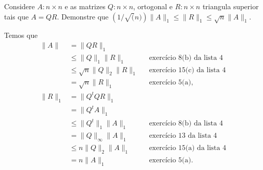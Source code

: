 \documentclass[a4paper,12pt, leqno, answers]{exam}
\newcommand{\cond}{\text{cond}}
\begin{document}
\begin{questions}

    \question Considere $A: n \times n$ e as matrizes $Q: n \times n$, ortogonal e $R: n \times n$ triangula superior tais que $A = QR$. Demonstre que $\left( 1 / \sqrt(n) \right) \| A \|_1 \leq \| R \|_1 \leq \sqrt{n} \| A \|_1$.
    \begin{solution}
        Temos que
        \begin{align*}
            \| A \| &= \| Q R \|_1 \\
            &\leq \| Q \|_1 \| R \|_1 && \text{exerc\'{i}cio 8(b) da lista 4} \\
            &\leq \sqrt{n} \| Q \|_2 \| R \|_1 && \text{exerc\'{i}cio 15(c) da lista 4} \\
            &= \sqrt{n} \| R \|_1 && \text{exerc\'{i}cio 5(a)}, \\
            \| R \|_1 &= \| Q^t Q R \|_1 \\
            &= \| Q^t A \|_1 \\
            &\leq \| Q^t \|_1 \| A \|_1 && \text{exerc\'{i}cio 8(b) da lista 4} \\
            &= \| Q \|_\infty \| A \|_1 && \text{exerc\'{i}cio 13 da lista 4} \\
            &\leq n \| Q \|_2 \| A \|_1 && \text{exerc\'{i}cio 15(a) da lista 4} \\
            &= n \| A \|_1 && \text{exerc\'{i}cio 5(a)}.
        \end{align*}
    \end{solution}


\end{questions}
\end{document}
